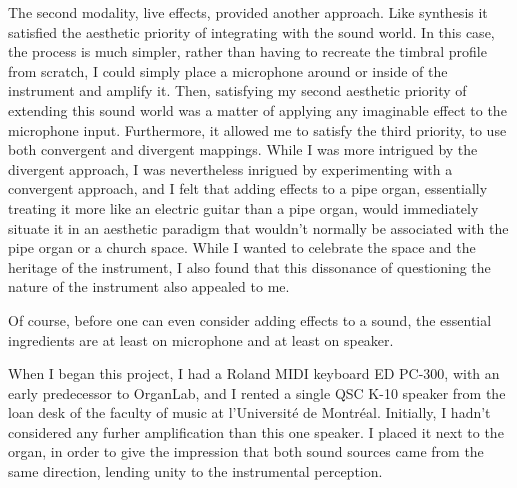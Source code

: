 \documentclass[12pt,twoside,maitrise]{dms_ks}
\theoremstyle{definition}
\begin{document}
The second modality, live effects, provided another approach. 
Like synthesis it satisfied the aesthetic priority of integrating with the sound world. 
In this case, the process is much simpler, rather than having to recreate the timbral profile from scratch, I could simply place a microphone around or inside of the instrument and amplify it. 
Then, satisfying my second aesthetic priority of extending this sound world was a matter of applying any imaginable effect to the microphone input. 
Furthermore, it allowed me to satisfy the third priority, to use both convergent and divergent mappings. 
While I was more intrigued by the divergent approach, I was nevertheless inrigued by experimenting with a convergent approach, and I felt that adding effects to a pipe organ, essentially treating it more like an electric guitar than a pipe organ, would immediately situate it in an aesthetic paradigm that wouldn't normally be associated with the pipe organ or a church space. 
While I wanted to celebrate the space and the heritage of the instrument, I also found that this dissonance of questioning the nature of the instrument also appealed to me. 

Of course, before one can even consider adding effects to a sound, the essential ingredients are at least on microphone and at least on speaker. 

When I began this project, I had a Roland MIDI keyboard ED PC-300, with an early predecessor to OrganLab, and I rented a single QSC K-10 speaker from the loan desk of the faculty of music at l'Université de Montréal. 
Initially, I hadn't considered any furher amplification than this one speaker. 
I placed it next to the organ, in order to give the impression that both sound sources came from the same direction, lending unity to the instrumental perception. 
\end{document}
